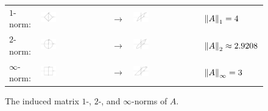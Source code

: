 \begin{example}
\begin{figure}[htbp]
\begin{center}
{\renewcommand{\tabularxcolumn}[1]{m{#1}}
\begin{tabularx}{\textwidth}{XXXXX}
$1$-norm: &
\hspace*{-1.5cm}\includegraphics[width=0.25\textwidth]{norm1annotated}&
$\rightarrow$&
\hspace*{-2cm}\includegraphics[width=0.25\textwidth]{normA1annotated}&
$\left\|{A}\right\|_1=4$\\
$2$-norm: &
\hspace*{-1.5cm}\includegraphics[width=0.25\textwidth]{norm2annotated}&
$\rightarrow$&
\hspace*{-2cm}\includegraphics[width=0.25\textwidth]{normA2annotated}&
$\left\|{A}\right\|_2\approx 2.9208$\\
$\infty$-norm: &
\hspace*{-1.5cm}\includegraphics[width=0.25\textwidth]{norminfannotated}&
$\rightarrow$&
\hspace*{-2cm}\includegraphics[width=0.25\textwidth]{normAinfannotated}&
$\left\|{A}\right\|_\infty=3$\\
\end{tabularx}}
\caption{The induced matrix $1$-, $2$-, and $\infty$-norms of $A$.}
\label{figure:InducedNorms}
\end{center}
\end{figure}
\end{example}

